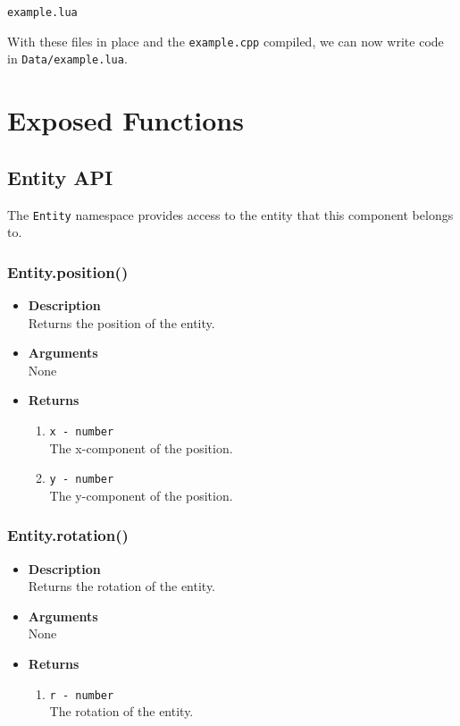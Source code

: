\documentclass[12pt,a4paper]{article}
\begin{document}
\begin{lstlisting}[title=Data/res.list]
example.lua
\end{lstlisting}

With these files in place and the \texttt{example.cpp} compiled, we can now write code in \texttt{Data/example.lua}.

\pagebreak
\section{Exposed Functions}

\subsection{Entity API}

The \texttt{Entity} namespace provides access to the entity that this component belongs to. 

\subsubsection{Entity.position()}
\begin{itemize}
	\item[]{\bf Description}
		\\ Returns the position of the entity.
	\item[]{\bf Arguments}
		\\ None
	\item[]{\bf Returns}
		\begin{enumerate}
			\item{\texttt{x - number}} 
				\\ The x-component of the position.
			\item{\texttt{y - number}} 
				\\ The y-component of the position.
		\end{enumerate}
		
\end{itemize}

\subsubsection{Entity.rotation()}
\begin{itemize}
	\item[]{\bf Description}
		\\ Returns the rotation of the entity.
	\item[]{\bf Arguments}
		\\ None
	\item[]{\bf Returns}
		\begin{enumerate}
			\item{\texttt{r - number}} 
				\\ The rotation of the entity.
		\end{enumerate}
		
\end{itemize}
\end{document}
